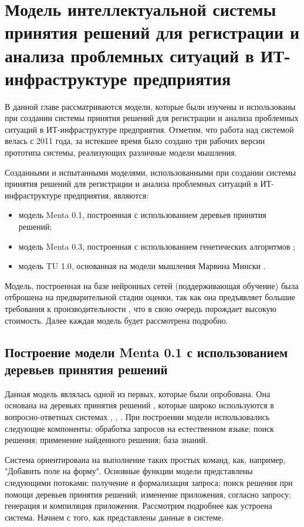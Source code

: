 \chapter{Модель интеллектуальной системы принятия решений для регистрации и анализа проблемных ситуаций в ИТ-инфраструктуре предприятия} \label{chapt3}

В данной главе рассматриваются модели, которые были изучены и использованы при создании системы принятия решений для регистрации и анализа проблемных ситуаций в ИТ-инфраструктуре предприятия. Отметим, что работа над системой велась с 2011 года, за истекшее время было создано три рабочих версии прототипа системы, реализующих различные модели мышления. \par
Созданными и испытанными моделями, использованными при создании системы принятия решений для регистрации и анализа проблемных ситуаций в ИТ-инфраструктуре предприятия, являются:
 \begin{itemize}
	\item модель Menta 0.1, построенная с использованием деревьев принятия решений;
	\item модель Menta 0.3, построенная с использованием генетических алгоритмов \cite{ArtificialIntelligence} ;
	\item модель TU 1.0, основанная на модели мышления Марвина Мински  \cite{EmotionMachine}.
\end{itemize}

Модель, построенная на базе нейронных сетей (поддерживающая обучение) была отброшена на предварительной стадии оценки, так как она предъявляет большие требования к производительности \cite{NEURAL}, что в свою очередь порождает высокую стоимость. Далее каждая модель будет рассмотрена подробно.


\section{Построение модели Menta 0.1 с использованием деревьев принятия решений} \label{sect3_1}
Данная модель являлась одной из первых, которые были опробована. Она основана на деревьях принятия решений \cite{DTREE}, которые широко используются в вопросно-ответных системах \cite{DC1}, \cite{DC2}, \cite{DC3}. При построении модели использовались следующие компоненты: обработка запросов на естественном языке; поиск решения; применение найденного решения; база знаний.\par
Система ориентирована на выполнение таких простых команд, как, например, "Добавить поле на форму". Основные функции модели представлены следующими потоками: получение и формализация запроса; поиск решения при помощи деревьев принятия решений; изменение приложения, согласно запросу; генерация и компиляция приложения. Рассмотрим подробнее как устроена система. Начнем с того, как представлены данные в системе.

